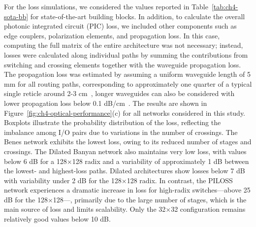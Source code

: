 For the loss simulations, we considered the values reported in Table~\ref{tab:ch4-sota-bb} for state-of-the-art building blocks.
In addition, to calculate the overall photonic integrated circuit (PIC) loss, we included other components such as edge couplers, polarization elements, and propagation loss.
In this case, computing the full matrix of the entire architecture was not necessary; instead, losses were calculated along individual paths by summing the contributions from switching and crossing elements together with the waveguide propagation loss.
The propagation loss was estimated by assuming a uniform waveguide length of 5 mm for all routing paths, corresponding to approximately one quarter of a typical single reticle around 2-3 cm~\cite{meiling2008performance}, longer waveguides can also be considered with lower propagation loss below 0.1 dB/cm~\cite{wgpropagationloss}.
The results are shown in Figure~\ref{fig:ch4-optical-performance}(c) for all networks considered in this study.
Boxplots illustrate the probability distribution of the loss, reflecting the imbalance among I/O pairs due to variations in the number of crossings.
The Benes network exhibits the lowest loss, owing to its reduced number of stages and crossings.
The Dilated Banyan network also maintains very low loss, with values below 6 dB for a 128$\times$128 radix and a variability of approximately 1 dB between the lowest- and highest-loss paths.
Dilated architectures show losses below 7 dB with variability under 2 dB for the 128$\times$128 radix.
In contrast, the PILOSS network experiences a dramatic increase in loss for high-radix switches—above 25 dB for the 128$\times$128—, primarily due to the large number of stages, which is the main source of loss and limits scalability.
Only the 32$\times$32 configuration remains relatively good values below 10 dB.
